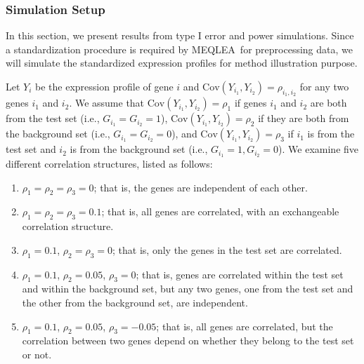 \documentclass[useAMS,usenatbib, galley]{biom}
\newcommand{\OurMethod}{MEQLEA}
\newcommand{\aaCase}{a}
\newcommand{\aCase}{c}
\newcommand{\cCase}{b}
\newcommand{\eCase}{d}
\newcommand{\fCase}{e}
\begin{document}
		\subsubsection{Simulation Setup}\label{subsection:simulation}
		In this section, we present results from type I error and power simulations. Since a standardization procedure is required by \OurMethod~for preprocessing data, we will simulate the standardized expression profiles for method illustration purpose. 
		
		Let $Y_{i}$ be the expression profile of gene $i$ and $\text{Cov}(Y_{i_1}, Y_{i_2})=\rho_{i_1, i_2}$ for any two genes $i_1$ and $i_2$. We assume that $\text{Cov}(Y_{i_1}, Y_{i_2})= \rho_1$ if genes $i_1$ and $i_2$ are both from the test set (i.e., $G_{i_1} = G_{i_2}=1$),  $\text{Cov}(Y_{i_1}, Y_{i_2}) =\rho_2$ if they are both from the background set (i.e., $G_{i_1} = G_{i_2}=0$), and  $\text{Cov}(Y_{i_1}, Y_{i_2})= \rho_3$ if $i_1$ is from the test set and $i_2$ is from the background set (i.e., $G_{i_1} =1,  G_{i_2}=0$). We examine five different correlation structures, listed as follows:
		
		\begin{enumerate}
			\item[(\aaCase):] $\rho_1 = \rho_2 = \rho_3 = 0$; that is, the genes are independent of each other.
			\item[(\cCase):] $\rho_1 = \rho_2 = \rho_3 = 0.1$; that is, all genes are correlated, with an exchangeable correlation structure. 
			\item[(\aCase):] $\rho_1 = 0.1$, $\rho_2 = \rho_3 = 0$; that is, only the genes in the test set are correlated.
			\item[(\eCase):] $\rho_1 = 0.1$, $\rho_2 = 0.05$, $\rho_3 = 0$; that is, 
			genes are correlated within the test set and within the background set, but any two genes, one from the test set and the other from the background set, are independent.
			\item[(\fCase):] $\rho_1 = 0.1$, $\rho_2 = 0.05$, $\rho_3 = -0.05$; that is, all genes are correlated, but the correlation between two genes depend on whether they belong to the test set or not.
		\end{enumerate}
		
\end{document}
